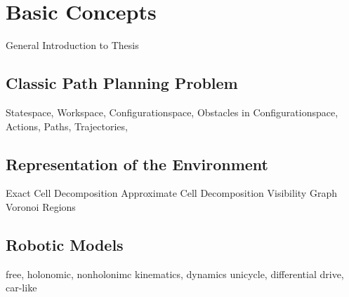 \chapter{Basic Concepts}\label{ch:introductionplanning}
General Introduction to Thesis

\section{Classic Path Planning Problem}\label{sec:basic}
Statespace,
Workspace,
Configurationspace,
Obstacles in Configurationspace,
Actions,
Paths,
Trajectories,

\section{Representation of the Environment}\label{sec:representation}
Exact Cell Decomposition
Approximate Cell Decomposition
Visibility Graph
Voronoi Regions

\section{Robotic Models}\label{sec:model}
free, holonomic, nonholonimc
kinematics, dynamics
unicycle, differential drive, car-like 

